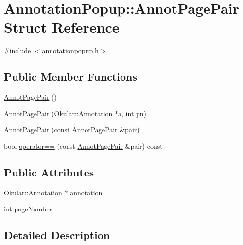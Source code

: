 \hypertarget{structAnnotationPopup_1_1AnnotPagePair}{\section{Annotation\+Popup\+:\+:Annot\+Page\+Pair Struct Reference}
\label{structAnnotationPopup_1_1AnnotPagePair}
}


{\ttfamily \#include $<$annotationpopup.\+h$>$}

\subsection*{Public Member Functions}
\begin{DoxyCompactItemize}
\item 
\hyperlink{structAnnotationPopup_1_1AnnotPagePair_a091f67bd8eaaf5117c141eda6b978b63}{Annot\+Page\+Pair} ()
\item 
\hyperlink{structAnnotationPopup_1_1AnnotPagePair_a522740e9cb89feae6e8505961ce60c0b}{Annot\+Page\+Pair} (\hyperlink{classOkular_1_1Annotation}{Okular\+::\+Annotation} $\ast$a, int pn)
\item 
\hyperlink{structAnnotationPopup_1_1AnnotPagePair_a89fc656319f701b28149ee0be4578482}{Annot\+Page\+Pair} (const \hyperlink{structAnnotationPopup_1_1AnnotPagePair}{Annot\+Page\+Pair} \&pair)
\item 
bool \hyperlink{structAnnotationPopup_1_1AnnotPagePair_a8ed247329a955126282431d764ec93f3}{operator==} (const \hyperlink{structAnnotationPopup_1_1AnnotPagePair}{Annot\+Page\+Pair} \&pair) const 
\end{DoxyCompactItemize}
\subsection*{Public Attributes}
\begin{DoxyCompactItemize}
\item 
\hyperlink{classOkular_1_1Annotation}{Okular\+::\+Annotation} $\ast$ \hyperlink{structAnnotationPopup_1_1AnnotPagePair_abd389ae75ec90cfcaabce2e79273af3c}{annotation}
\item 
int \hyperlink{structAnnotationPopup_1_1AnnotPagePair_abd8fe2b8ae303985a9a08784c6069d29}{page\+Number}
\end{DoxyCompactItemize}


\subsection{Detailed Description}


